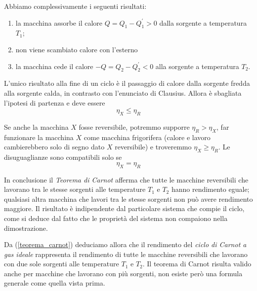 \documentclass[class=book, crop=false, oneside, 12pt]{standalone}
\begin{document}
Abbiamo complessivamente i seguenti risultati:
\begin{enumerate}
    \item la macchina assorbe il calore \(Q = Q_1 -Q_1^{\prime}> 0\) dalla sorgente a temperatura \(T_1\);
    \item non viene scambiato calore con l'esterno
    \item la macchina cede il calore \(-Q = Q_2 - Q_2^{\prime} < 0 \) alla sorgente a temperatura \(T_2\).
\end{enumerate} 
L'unico risultato alla fine di un ciclo è il passaggio di calore dalla sorgente fredda alla sorgente calda, in contrasto con l'enunciato di Clausius. 
Allora è sbagliata l'ipotesi di partenza e deve essere
\begin{equation}
    \eta_X \leq \eta_R
\end{equation}

Se anche la macchina \(X\) fosse reversibile, potremmo supporre \(\eta_R > \eta_X\), far funzionare la macchina \(X\) come macchina frigorifera (calore e lavoro cambierebbero solo di segno dato \(X\) reversibile)
e troveremmo \(\eta_X \geq \eta_R\).
Le disuguaglianze sono compatibili solo se
\begin{equation} \label{teorema_carnot}
    \eta_X = \eta_R
\end{equation}

In conclusione il \emph{Teorema di Carnot} afferma che tutte le macchine reversibili che lavorano tra le stesse sorgenti alle temperature \(T_1\) e \(T_2\) hanno rendimento eguale; qualsiasi altra macchina che lavori tra le stesse sorgenti non può avere rendimento maggiore. 
Il risultato è indipendente dal particolare sistema che compie il ciclo, come si deduce dal fatto che le proprietà del sistema non compaiono nella dimostrazione.

Da (\ref{teorema_carnot}) deduciamo allora che il rendimento del \emph{ciclo di Carnot a gas ideale} rappresenta il rendimento di tutte le macchine reversibili che lavorano con due sole sorgenti alle temperature \(T_1\) e \(T_2\).
Il teorema di Carnot risulta valido anche per macchine che lavorano con più sorgenti, non esiste però una formula generale come quella vista prima.
\end{document}
